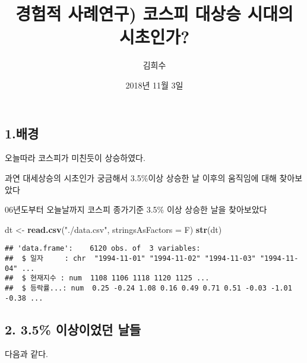 \documentclass[]{article}
\title{경험적 사례연구) 코스피 대상승 시대의 시초인가?}
\author{김희수}
\date{2018년 11월 3일}
\newenvironment{Shaded}{\begin{snugshade}}{\end{snugshade}}
\newcommand{\KeywordTok}[1]{\textcolor[rgb]{0.13,0.29,0.53}{\textbf{#1}}}
\newcommand{\DataTypeTok}[1]{\textcolor[rgb]{0.13,0.29,0.53}{#1}}
\newcommand{\StringTok}[1]{\textcolor[rgb]{0.31,0.60,0.02}{#1}}
\newcommand{\NormalTok}[1]{#1}
\begin{document}
\maketitle

\subsection{1.배경}

오늘따라 코스피가 미친듯이 상승하였다.

과연 대세상승의 시초인가 궁금해서 3.5\%이상 상승한 날 이후의 움직임에
대해 찾아보았다

06년도부터 오늘날까지 코스피 종가기준 3.5\% 이상 상승한 날을 찾아보았다

\begin{Shaded}
\begin{Highlighting}[]
\NormalTok{dt <-}\StringTok{ }\KeywordTok{read.csv}\NormalTok{(}\StringTok{"./data.csv"}\NormalTok{,}
               \DataTypeTok{stringsAsFactors =}\NormalTok{ F)}
\KeywordTok{str}\NormalTok{(dt)}
\end{Highlighting}
\end{Shaded}

\begin{verbatim}
## 'data.frame':    6120 obs. of  3 variables:
##  $ 일자     : chr  "1994-11-01" "1994-11-02" "1994-11-03" "1994-11-04" ...
##  $ 현재지수 : num  1108 1106 1118 1120 1125 ...
##  $ 등락률...: num  0.25 -0.24 1.08 0.16 0.49 0.71 0.51 -0.03 -1.01 -0.38 ...
\end{verbatim}

\subsection{2. 3.5\% 이상이었던 날들}\label{-}

다음과 같다.
\end{document}
